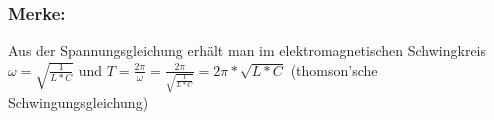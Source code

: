 			\subsubsection{Merke:}
			
			Aus der Spannungsgleichung erhält man im elektromagnetischen Schwingkreis $ \omega = \sqrt{\frac{1}{L \ast C}} $ und $ T = \frac{2\pi}{\omega} = \frac{2\pi}{\sqrt{\frac{1}{L \ast C}}} = 2\pi \ast \sqrt{L \ast C}$ (thomson'sche Schwingungsgleichung)